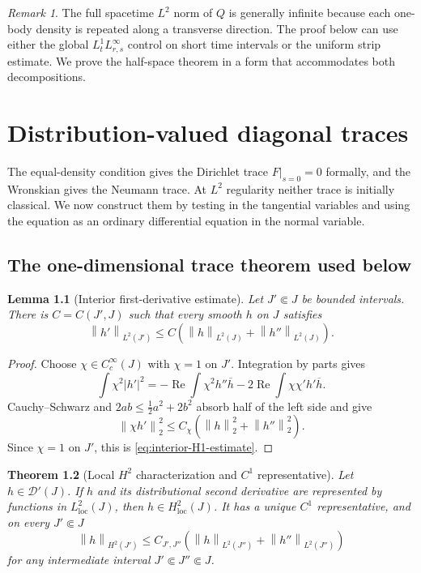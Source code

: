\documentclass[11pt,oneside]{book}
\newtheorem{theorem}{Theorem}[chapter]
\newtheorem{lemma}[theorem]{Lemma}
\theoremstyle{definition}
\theoremstyle{remark}
\newtheorem{remark}[theorem]{Remark}
\newcommand{\D}{\mathcal D}
\newcommand{\1}{\mathbf 1}
\newcommand{\loc}{\mathrm{loc}}
\newcommand{\Rea}{\operatorname{Re}}
\newcommand{\norm}[1]{\left\lVert #1\right\rVert}
\begin{document}
\begin{remark}
The full spacetime $L^2$ norm of $Q$ is generally infinite because each
one-body density is repeated along a transverse direction.  The proof below
can use either the global $L^1_tL^\infty_{r,s}$ control on short time
intervals or the uniform strip estimate.  We prove the half-space theorem in
a form that accommodates both decompositions.
\end{remark}

\chapter{Distribution-valued diagonal traces}\label{chap:traces}

The equal-density condition gives the Dirichlet trace $F|_{s=0}=0$ formally,
and the Wronskian gives the Neumann trace.  At $L^2$ regularity neither trace
is initially classical.  We now construct them by testing in the tangential
variables and using the equation as an ordinary differential equation in the
normal variable.

\section{The one-dimensional trace theorem used below}

\begin{lemma}[Interior first-derivative estimate]
\label{lem:interior-first-derivative}
Let $J'\Subset J$ be bounded intervals.  There is $C=C(J',J)$ such that every
smooth $h$ on $J$ satisfies
\begin{equation}
 \norm{h'}_{L^2(J')}
 \le C\left(\norm h_{L^2(J)}+\norm{h''}_{L^2(J)}\right). \label{eq:interior-H1-estimate}
\end{equation}
\end{lemma}

\begin{proof}
Choose $\chi\in C_c^\infty(J)$ with $\chi=1$ on $J'$.  Integration by parts
gives
\[
 \int\chi^2|h'|^2
 =-\Rea\int\chi^2h''\overline h
   -2\Rea\int\chi\chi'h'\overline h.
\]
Cauchy--Schwarz and $2ab\le\tfrac12a^2+2b^2$ absorb half of the left side and
give
\[
 \norm{\chi h'}_2^2
 \le C_\chi\left(\norm h_2^2+\norm{h''}_2^2\right).
\]
Since $\chi=1$ on $J'$, this is \eqref{eq:interior-H1-estimate}.
\end{proof}

\begin{theorem}[Local $H^2$ characterization and $C^1$ representative]
\label{thm:local-H2-characterization}
Let $h\in\D'(J)$.  If $h$ and its distributional second derivative are
represented by functions in $L^2_{\loc}(J)$, then
$h\in H^2_{\loc}(J)$.  It has a unique $C^1$ representative, and on every
$J'\Subset J$
\begin{equation}
 \norm h_{H^2(J')}
 \le C_{J',J''}
 \left(\norm h_{L^2(J'')}+\norm{h''}_{L^2(J'')}\right) \label{eq:local-H2-bound}
\end{equation}
for any intermediate interval $J'\Subset J''\Subset J$.
\end{theorem}
\end{document}
